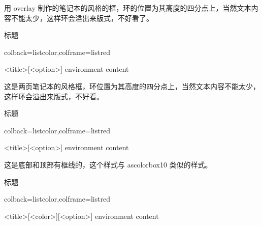 \documentclass[fontset=none]{ctexart}
\begin{document}
	用 overlay 制作的笔记本的风格的框，环的位置为其高度的四分点上，当然文本内容不能太少，这样环会溢出来版式，不好看了。
	
	\begin{dispExample}
		\begin{ascolorbox14}{标题}
			\zhlipsum[1-2]
		\end{ascolorbox14}
	\end{dispExample}
	
	
	
	
	
	
	
	\begin{dispListing*}{colback=listcolor,colframe=listred}
		\begin{ascolorbox15}{<title>}[<option>]
			environment content
		\end{ascolorbox15}
	\end{dispListing*}
	
	这是两页笔记本的风格框，环位置为其高度的四分点上，当然文本内容不能太少，这样环会溢出来版式，不好看。
	
	\begin{dispExample}
		\begin{ascolorbox15}{标题}
			\zhlipsum[1]
		\end{ascolorbox15}
	\end{dispExample}
	
	
	
	
	
	
	
	\begin{dispListing*}{colback=listcolor,colframe=listred}
		\begin{ascolorbox16}{<title>}[<option>]
			environment content
		\end{ascolorbox16}
	\end{dispListing*}
	
	这是底部和顶部有框线的，这个样式与 ascolorbox10 类似的样式。
	
	\begin{dispExample}
		\begin{ascolorbox16}{标题}
			\zhlipsum[1]
		\end{ascolorbox16}
	\end{dispExample}
	
	
	
	
	\begin{dispListing*}{colback=listcolor,colframe=listred}
		\begin{ascolorbox17}[<subtitle>]{<title>}[<color>][<option>]
			environment content
		\end{ascolorbox17}
	\end{dispListing*}
	
\end{document}
